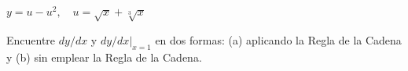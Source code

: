\item $y = u - u^2, \quad u = \sqrt{x} + \sqrt[3]{x}$
\par
Encuentre $dy/dx$ y $dy/dx|_{x=1}$ en dos formas: (a) aplicando la Regla de la Cadena y (b) sin emplear la Regla de la Cadena.
